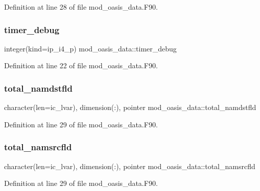 Definition at line 28 of file mod\+\_\+oasis\+\_\+data.\+F90.

\mbox{\label{namespacemod__oasis__data_a320a34357de5c3049ccf102df7b97f5e}} 
\subsubsection{\texorpdfstring{timer\+\_\+debug}{timer\_debug}}
{\footnotesize\ttfamily integer(kind=ip\+\_\+i4\+\_\+p) mod\+\_\+oasis\+\_\+data\+::timer\+\_\+debug}



Definition at line 22 of file mod\+\_\+oasis\+\_\+data.\+F90.

\mbox{\label{namespacemod__oasis__data_a81466361b20004007f221dd6a32041f9}} 
\subsubsection{\texorpdfstring{total\+\_\+namdstfld}{total\_namdstfld}}
{\footnotesize\ttfamily character(len=ic\+\_\+lvar), dimension(\+:), pointer mod\+\_\+oasis\+\_\+data\+::total\+\_\+namdstfld}



Definition at line 29 of file mod\+\_\+oasis\+\_\+data.\+F90.

\mbox{\label{namespacemod__oasis__data_a58b5a440f274f5dfb942d7e18f12674c}} 
\subsubsection{\texorpdfstring{total\+\_\+namsrcfld}{total\_namsrcfld}}
{\footnotesize\ttfamily character(len=ic\+\_\+lvar), dimension(\+:), pointer mod\+\_\+oasis\+\_\+data\+::total\+\_\+namsrcfld}



Definition at line 29 of file mod\+\_\+oasis\+\_\+data.\+F90.

